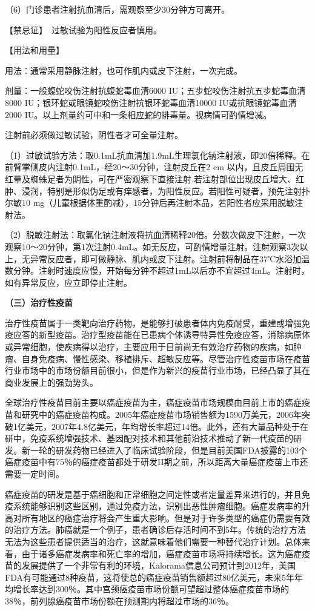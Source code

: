 （6）门诊患者注射抗血清后，需观察至少30分钟方可离开。

【禁忌证】　过敏试验为阳性反应者慎用。

【用法和用量】

用法：通常采用静脉注射，也可作肌内或皮下注射，一次完成。

剂量：一般蝮蛇咬伤注射抗蝮蛇毒血清6000
IU；五步蛇咬伤注射抗五步蛇毒血清8000
IU；银环蛇或眼镜蛇咬伤注射抗银环蛇毒血清10000 IU或抗眼镜蛇毒血清2000
IU。以上剂量约可中和一条相应蛇的排毒量。视病情可酌情增减。

注射前必须做过敏试验，阴性者才可全量注射。

（1）过敏试验方法：取0.1mL抗血清加1.9mL生理氯化钠注射液，即20倍稀释。在前臂掌侧皮内注射0.1mL，经20～30分钟，注射皮丘在2
cm
以内，且皮丘周围无红晕及蜘蛛足者为阴性，可在严密观察下直接注射.若注射部位出现皮丘增大、红肿、浸润，特别是形似伪足或有痒感者，为阳性反应。若阳性可疑者，预先注射扑尔敏10
mg（儿童根据体重酌减），15分钟后再注射本品，若阳性者应采用脱敏注射法。

（2）脱敏注射法：取氯化钠注射液将抗血清稀释20倍。分数次做皮下注射，一次观察10～20分钟，第1次注射0.4mL。如无反应，可酌情增量注射。注射观察3次以上，无异常反应者，即可做静脉、肌内或皮下注射。注射前将制品在37℃水浴加温数分钟。注射时速度应慢，开始每分钟不超过1mL以后亦不宜超过4mL。注射时，如有异常反应，应立即停止注射。

\textbf{（三）治疗性疫苗}

治疗性疫苗属于一类靶向治疗药物，是能够打破患者体内免疫耐受，重建或增强免疫应答的新型疫苗。治疗型疫苗能在已患病个体诱导特异性免疫应答，消除病原体或异常细胞，使疾病得以治疗，主要应用于目前尚无有效治疗药物的疾病，如肿瘤、自身免疫病、慢性感染、移植排斥、超敏反应等。尽管治疗性疫苗市场在疫苗行业市场中的市场份额目前很小，但是作为新兴的疫苗行业市场，已经凸显了其在商业发展上的强劲势头。

全球治疗性疫苗目前主要以癌症疫苗为主，癌症疫苗市场规模由目前上市的癌症疫苗和研究中的癌症疫苗构成。2005年癌症疫苗市场销售额为1590万美元，2006年突破1亿美元，2007年4.8亿美元，年均增长率超过14倍。此外，还有大量品种处于在研中，免疫系统增强技术、基因配对技术和其他前沿技术推动了新一代疫苗的研发。新一轮的研发药物已经进入了临床试验阶段，但是目前美国FDA披露的103个癌症疫苗中有75％的癌症疫苗都处于研发II期之前，所以距离大量癌症疫苗上市还需要一定时间。

癌症疫苗的研发是基于癌细胞和正常细胞之间定性或者定量差异来进行的，并且免疫系统能够识别这些区别，通过免疫方法，识别出恶性肿瘤细胞。癌症发病率的升高对所有地区的癌症治疗将会产生重大影响。但是对于许多类型的癌症仍需要有效的治疗方法。肺癌就是一个例子，患者确诊后存活时间不到5年。传统的治疗方法无法为这些患者提供适当的治疗，这就意味着他们需要一种替代治疗计划。总体来看，由于诸多癌症发病率和死亡率的增加，癌症疫苗市场将持续增长。这为癌症疫苗的发展提供了一个非常有利的环境，Kalorama信息公司预计到2012年，美国FDA有可能通过8种疫苗，这将使总的癌症疫苗销售额超过80亿美元，未来5年年均增长率达到300％。其中宫颈癌疫苗市场份额可望超过整体癌症疫苗市场的38％，前列腺癌疫苗市场份额在预测期内将超过市场的36％。

